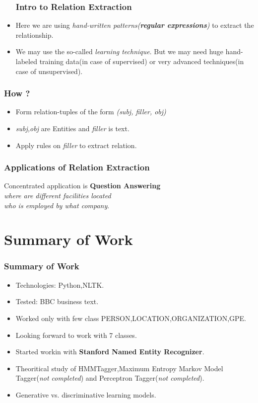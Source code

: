 \documentclass{beamer} %
\theoremstyle{definition} %
\begin{document}
\begin{frame}
\begin{itemize}
\frametitle{Intro to Relation Extraction}
\item Here we are using \textit{hand-written patterns(\textbf{regular expressions})} to extract the relationship.
\item We may use the so-called \textit{learning technique}. But we may need huge hand-labeled
 training data(in case of supervised) or very advanced techniques(in case of unsupervised).
\end{itemize}
\end{frame}

\begin{frame}
\frametitle{How ?}
\begin{itemize}
\item Form relation-tuples of the form \textit{(subj, filler, obj)}
\item \textit{subj,obj} are Entities and \textit{filler} is text.
\item Apply rules on \textit{filler} to extract relation.
\end{itemize}
\end{frame}

\begin{frame}
\frametitle{Applications of Relation Extraction}
Concentrated application is
\textbf{Question Answering}\\
\textit{where are different facilities located}\\
\textit{who is employed by what company}.\\
\end{frame}

\section[Summary]{Summary of Work}
\begin{frame}
\frametitle{Summary of Work}
\begin{itemize}
\item Technologies: Python,NLTK.\\
\item Tested: BBC business text.\\
\item Worked only with few class PERSON,LOCATION,ORGANIZATION,GPE.\\
\item Looking forward to work with 7 classes.
\item Started workin with \textbf{Stanford Named Entity Recognizer}.
\item Theoritical study of HMMTagger,Maximum Entropy Markov Model Tagger(\textit{not completed}) and Perceptron Tagger(\textit{not completed}).
\item Generative vs. discriminative learning models.
\end{itemize}
\end{frame}
\end{document}
